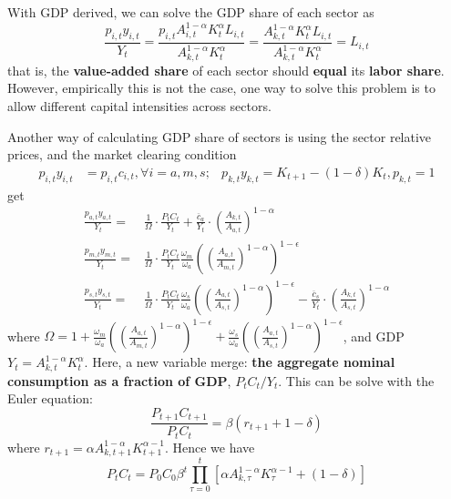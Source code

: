 \documentclass[10pt,landscape,a4paper]{article}
\let\bar\overline
\begin{document}
\begin{multicols*}{3}
\vspace{2pt}

With GDP derived, we can solve the GDP share of each sector as
$$
\frac{p_{i,t}y_{i,t}}{Y_t}=\frac{p_{i,t}A_{i,t}^{1-\alpha}K_t^{\alpha}L_{i,t}}{A_{k,t}^{1-\alpha}K_t^{\alpha}} = \frac{A_{k,t}^{1-\alpha}K_t^{\alpha}L_{i,t}}{A_{k,t}^{1-\alpha}K_t^{\alpha}} = L_{i,t}
$$
that is, the \textbf{value-added share} of each sector should \textbf{\color{myred}equal} its \textbf{labor share}. However, empirically this is not the case, one way to solve this problem is to allow different capital intensities across sectors. 

\vspace{2pt}
Another way of calculating GDP share of sectors is using the sector relative prices, and the market clearing condition 
\begin{align*}
    p_{i,t}y_{i,t} &= p_{i,t}c_{i,t},\forall i = a,m,s;&p_{k,t}y_{k,t} = K_{t+1}-(1-\delta)K_t,p_{k,t}=1
\end{align*}
get
\begin{align*}
    \frac{p_{a,t}y_{a,t}}{Y_t}=&\frac{1}{\Omega}\cdot\frac{P_tC_t}{Y_t}+\frac{\bar{c}_a}{Y_t}\cdot \left( \frac{A_{k,t}}{A_{a,t}}\right)^{1-\alpha}\\
    \frac{p_{m,t}y_{m,t}}{Y_t}=&\frac{1}{\Omega}\cdot\frac{P_tC_t}{Y_t}\frac{\omega_m}{\omega_a} \left(\left(\frac{A_{a,t}}{A_{m,t}}\right)^{1-\alpha}\right)^{1-\epsilon}\\
    \frac{p_{s,t}y_{s,t}}{Y_t}=&\frac{1}{\Omega}\cdot\frac{P_tC_t}{Y_t}\frac{\omega_s}{\omega_a} \left(\left(\frac{A_{a,t}}{A_{s,t}}\right)^{1-\alpha}\right)^{1-\epsilon}-\frac{\bar{c}_s}{Y_t}\cdot \left( \frac{A_{k,t}}{A_{s,t}}\right)^{1-\alpha}
\end{align*}
where $\Omega = 1+\frac{\omega_m}{\omega_a}\left(\left(\frac{A_{a,t}}{A_{m,t}}\right)^{1-\alpha}\right)^{1-\epsilon} + \frac{\omega_s}{\omega_a}\left(\left(\frac{A_{a,t}}{A_{s,t}}\right)^{1-\alpha}\right)^{1-\epsilon}$, and GDP $Y_t = A_{k,t}^{1-\alpha}K_t^{\alpha}$. Here, a new variable merge: \textbf{the aggregate nominal consumption as a fraction of GDP}, $P_tC_t/Y_t$. This can be solve with the Euler equation:
$$
\frac{P_{t+1}C_{t+1}}{P_tC_t}=\beta\left(r_{t+1}+1-\delta\right)
$$
where $r_{t+1}=\alpha A_{k,t+1}^{1-\alpha}K_{t+1}^{\alpha-1}$. Hence we have 
$$
P_tC_t = P_0C_0\beta^t\prod^{t}_{\tau=0}\left[\alpha A_{k,\tau}^{1-\alpha}K_{\tau}^{\alpha-1}+(1-\delta)\right]
$$


\end{multicols*}
\end{document}
